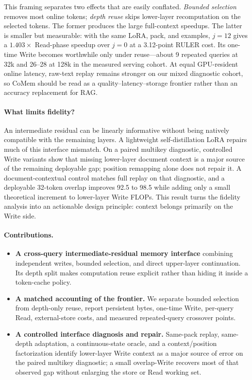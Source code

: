 This framing separates two effects that are easily conflated. \emph{Bounded
selection} removes most online tokens; \emph{depth reuse} skips lower-layer
recomputation on the selected tokens. The former produces the large
full-context speedups. The latter is smaller but measurable: with the same LoRA,
pack, and examples, $j{=}12$ gives a $1.403\times$ Read-phase speedup over
$j{=}0$ at a 3.12-point RULER cost. Its one-time Write becomes worthwhile only
under reuse---about 9 repeated queries at 32k and 26--28 at 128k in the measured
serving cohort. At equal GPU-resident online latency, raw-text replay remains
stronger on our mixed diagnostic cohort, so CoMem should be read as a
quality--latency--storage frontier rather than an accuracy replacement for RAG.

\paragraph{What limits fidelity?}
An intermediate residual can be linearly informative without being natively
compatible with the remaining layers. A lightweight self-distillation LoRA
repairs much of this interface mismatch. On a paired multikey diagnostic,
controlled Write variants show that missing lower-layer document context is a
major source of the remaining deployable gap; position remapping alone does not
repair it. A document-contextual control matches full replay on that diagnostic,
and a deployable 32-token overlap improves
92.5 to 98.5 while adding only a small theoretical increment to lower-layer
Write FLOPs. This result turns the fidelity analysis into an actionable design
principle: context belongs primarily on the Write side.

\paragraph{Contributions.}
\begin{itemize}[leftmargin=1.2em,itemsep=2pt]
\item \textbf{A cross-query intermediate-residual memory interface} combining
independent writes, bounded selection, and direct upper-layer continuation. Its
depth split makes computation reuse explicit rather than hiding it inside a
token-cache policy.
\item \textbf{A matched accounting of the frontier.} We separate bounded
selection from depth-only reuse, report persistent bytes, one-time Write,
per-query Read, external-store costs, and measured repeated-query crossover
points.
\item \textbf{A controlled interface diagnosis and repair.} Same-pack replay,
same-depth adaptation, a continuous-state oracle, and a context/position
factorization identify lower-layer Write context as a major source of error on
the paired multikey diagnostic; a small overlap-Write recovers most of that
observed gap without enlarging the store or Read working set.
\end{itemize}
